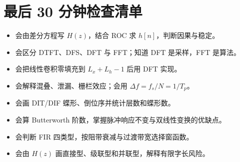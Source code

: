 ﻿\documentclass[UTF8,10pt,a4paper]{ctexart}
\begin{document}
\section{最后 30 分钟检查清单}
\begin{itemize}
  \item 会由差分方程写 $H(z)$，结合 ROC 求 $h[n]$，判断因果与稳定。
  \item 会区分 DTFT、DFS、DFT 与 FFT；知道 DFT 是采样，FFT 是算法。
  \item 会把线性卷积零填充到 $L_x+L_h-1$ 后用 DFT 实现。
  \item 会解释混叠、泄漏、栅栏效应；会用 $\Delta f=f_s/N=1/T_p$。
  \item 会画 DIT/DIF 蝶形、倒位序并统计层数和蝶形数。
  \item 会算 Butterworth 阶数，掌握脉冲响应不变与双线性变换的优缺点。
  \item 会判断 FIR 四类型，按阻带衰减与过渡带宽选择窗函数。
  \item 会由 $H(z)$ 画直接型、级联型和并联型，解释有限字长风险。
\end{itemize}
\end{document}
